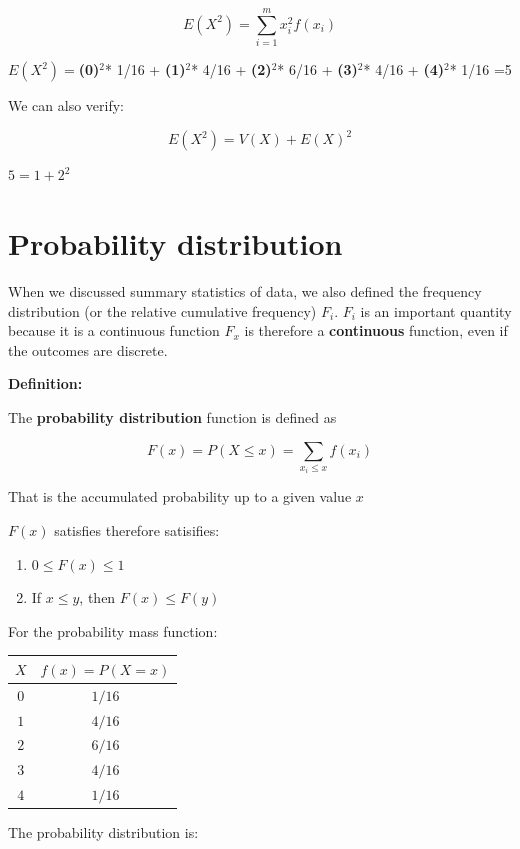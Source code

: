\documentclass[
]{book}
\providecommand{\tightlist}{%
  \setlength{\itemsep}{0pt}\setlength{\parskip}{0pt}}
\begin{document}
\[E(X^2) =\sum_{i=1}^m x_i^2 f(x_i)\]

\(E(X^2)=\)\textbf{(0)}\(^2\)* 1/16 + \textbf{(1)}\(^2\)* 4/16 + \textbf{(2)}\(^2\)* 6/16 + \textbf{(3)}\(^2\)* 4/16 + \textbf{(4)}\(^2\)* 1/16 =5

We can also verify:

\[E(X^2)=V(X)+E(X)^2\]

\(5=1+2^2\)

\hypertarget{probability-distribution}{%
\section{Probability distribution}\label{probability-distribution}}

When we discussed summary statistics of data, we also defined the frequency distribution (or the relative cumulative frequency) \(F_i\). \(F_i\) is an important quantity because it is a continuous function \(F_x\) is therefore a \textbf{continuous} function, even if the outcomes are discrete.

\textbf{Definition:}

The \textbf{probability distribution} function is defined as

\[F(x)=P(X\leq x)=\sum_{x_i\leq x} f(x_i) \]

That is the accumulated probability up to a given value \(x\)

\(F(x)\) satisfies therefore satisifies:

\begin{enumerate}
\def\labelenumi{\arabic{enumi})}
\tightlist
\item
  \(0\leq F(x) \leq 1\)
\item
  If \(x \leq y\), then \(F(x) \leq F(y)\)
\end{enumerate}

For the probability mass function:

\begin{longtable}[]{@{}cc@{}}
\toprule\noalign{}
\(X\) & \(f(x)=P(X=x)\) \\
\midrule\noalign{}
\endhead
\bottomrule\noalign{}
\endlastfoot
\(0\) & \(1/16\) \\
\(1\) & \(4/16\) \\
\(2\) & \(6/16\) \\
\(3\) & \(4/16\) \\
\(4\) & \(1/16\) \\
\end{longtable}

The probability distribution is:
\end{document}
